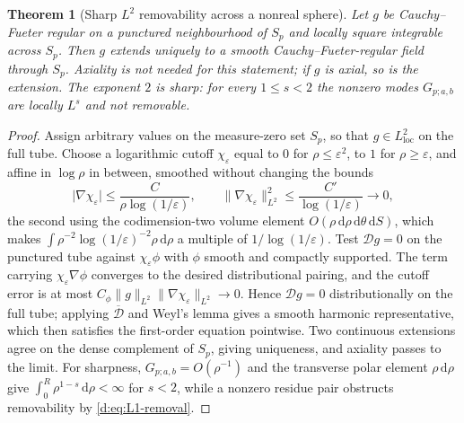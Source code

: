 \documentclass[11pt,a4paper]{article}
\numberwithin{equation}{section}
\newtheorem{theorem}{Theorem}[section]
\theoremstyle{definition}
\theoremstyle{remark}
\theoremstyle{plain}
\newcommand{\Dop}{\mathcal D}
\newcommand{\Sp}{S_{p}}
\newcommand{\abs}[1]{\lvert #1\rvert}
\newcommand{\norm}[1]{\lVert #1\rVert}
\newcommand{\dd}{\mathrm d}
\begin{document}
\begin{theorem}[Sharp $L^2$ removability across a nonreal sphere]
\label{d:thm:L2}
Let $g$ be Cauchy--Fueter regular on a punctured neighbourhood of $\Sp$ and
locally square integrable across $\Sp$.  Then $g$ extends uniquely to a
smooth Cauchy--Fueter-regular field through $\Sp$.  Axiality is not needed
for this statement; if $g$ is axial, so is the extension.  The exponent $2$
is sharp: for every $1\le s<2$ the nonzero modes $G_{p;a,b}$ are locally
$L^s$ and not removable.
\end{theorem}

\begin{proof}
Assign arbitrary values on the measure-zero set $\Sp$, so that $g\in
L^2_{\mathrm{loc}}$ on the full tube.  Choose a logarithmic cutoff
$\chi_\varepsilon$ equal to $0$ for $\rho\le\varepsilon^2$, to $1$ for
$\rho\ge\varepsilon$, and affine in $\log\rho$ in between, smoothed without
changing the bounds
\[
 \abs{\nabla\chi_\varepsilon}\le\frac{C}{\rho\log(1/\varepsilon)},
 \qquad
 \norm{\nabla\chi_\varepsilon}_{L^2}^2\le\frac{C'}{\log(1/\varepsilon)}
 \longrightarrow0 ,
\]
the second using the codimension-two volume element
$O(\rho\,\dd\rho\,\dd\theta\,\dd S)$, which makes
$\int\rho^{-2}\log(1/\varepsilon)^{-2}\rho\,\dd\rho$ a multiple of
$1/\log(1/\varepsilon)$.  Test $\Dop g=0$ on the punctured tube against
$\chi_\varepsilon\phi$ with $\phi$ smooth and compactly supported.  The
term carrying $\chi_\varepsilon\nabla\phi$ converges to the desired
distributional pairing, and the cutoff error is at most
$C_\phi\norm g_{L^2}\norm{\nabla\chi_\varepsilon}_{L^2}\to0$.  Hence
$\Dop g=0$ distributionally on the full tube; applying
$\overline{\Dop}$ and Weyl's lemma gives a smooth harmonic representative,
which then satisfies the first-order equation pointwise.  Two continuous
extensions agree on the dense complement of $\Sp$, giving uniqueness, and
axiality passes to the limit.  For sharpness, $G_{p;a,b}=O(\rho^{-1})$ and
the transverse polar element $\rho\,\dd\rho$ give
$\int_0^{R}\rho^{1-s}\,\dd\rho<\infty$ for $s<2$, while a nonzero residue
pair obstructs removability by \eqref{d:eq:L1-removal}.
\end{proof}
\end{document}

